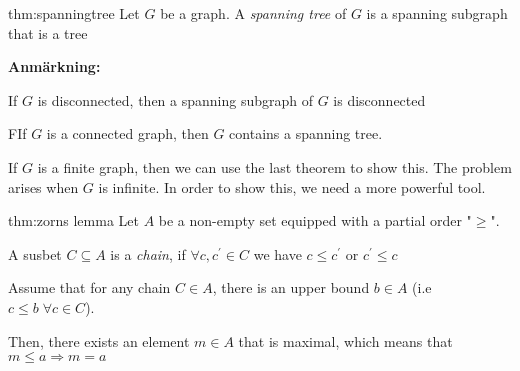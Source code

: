 \par\bigskip
\begin{theo}{thm:spanningtree}
  Let $G$ be a graph. A \textit{spanning tree} of $G$ is a spanning subgraph that is a tree
\end{theo}
\par\bigskip
\noindent\textbf{Anmärkning:}\par
\noindent If $G$ is disconnected, then a spanning subgraph of $G$ is disconnected
\par\bigskip
\begin{theo}
  FIf $G$ is a connected graph, then $G$ contains a spanning tree.
  \par\bigskip
  \noindent If $G$ is a finite graph, then we can use the last theorem to show this. The problem arises when $G$ is infinite. In order to show this, we need a more powerful tool.
\end{theo}
\par\bigskip
\begin{theo}{thm:zorns lemma}
  Let $A$ be a non-empty set equipped with a partial order "$\geq$".
  \par\bigskip
  \noindent A susbet $C\subseteq A$ is a \textit{chain}, if $\forall c,c^{\prime}\in C$ we have $c\leq c^{\prime}$ or $c^{\prime}\leq c$
  \par\bigskip
  \noindent Assume that for any chain $C\in A$, there is an upper bound $b\in A$ (i.e $c\leq b\;\forall c\in C$).\par
  \noindent Then, there exists an element $m\in A$ that is maximal, which means that $m\leq a\Rightarrow m=a$
\end{theo}
\par\bigskip
